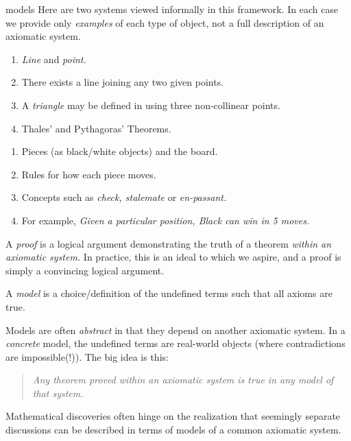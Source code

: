\begin{examples}{}{models}
	Here are two systems viewed informally in this framework. In each case we provide only \emph{examples} of each type of object, not a full description of an axiomatic system.\vspace{-5pt}
	\begin{description}\itemsep0pt
		\item[\normalfont\emph{Basic Geometry}]\begin{enumerate}\itemsep2pt
		  \item \emph{Line} and \emph{point.}
		  \item There exists a line joining any two given points.
		  \item A \emph{triangle} may be defined in using three non-collinear points. 
		  \item Thales' and Pythagoras' Theorems.
	  \end{enumerate}
		\item[\normalfont\emph{Chess}]\begin{enumerate}\itemsep2pt
		  \item Pieces (as black/white objects) and the board.
		  \item Rules for how each piece moves.
		  \item Concepts such as \emph{check, stalemate} or \emph{en-passant.}
		  \item For example, \emph{Given a particular position, Black can win in 5 moves.}
	  \end{enumerate}	
	\end{description}
\end{examples}


A \emph{proof} is a logical argument demonstrating the truth of a theorem \emph{within an axiomatic system.} In practice, this is an ideal to which we aspire, and a proof is simply a convincing logical argument.



\begin{defn}{}{}
	A \emph{model} is a choice/definition of the undefined terms such that all axioms are true.
\end{defn}

Models are often \emph{abstract} in that they depend on another axiomatic system. In a \emph{concrete} model, the undefined terms are real-world objects (where contradictions are impossible(!)). The big idea is this:
\begin{quote}
	\emph{Any theorem proved within an axiomatic system is true in any model of that system.}
\end{quote}
Mathematical discoveries often hinge on the realization that seemingly separate discussions can be described in terms of models of a common axiomatic system.


